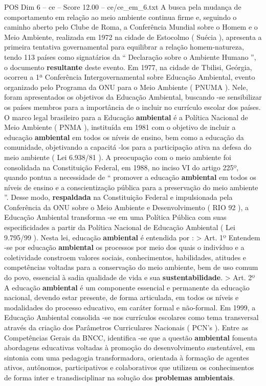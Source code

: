 \begin{textsample}{POS Dim 6 – ce – Score 12.00 – ce/ce\_em\_6.txt}
A busca pela mudança de comportamento em relação ao meio ambiente continua firme e, seguindo o caminho aberto pelo Clube de Roma, a Conferência Mundial sobre o Homem e o Meio Ambiente, realizada em 1972 na cidade de Estocolmo ( Suécia ), apresenta a primeira tentativa governamental para equilibrar a relação homem-natureza, tendo 113 países como signatários da “ Declaração sobre o Ambiente Humano ”, o documento \textbf{resultante} deste evento.
Em 1977, na cidade de Tbilisi, Geórgia, ocorreu a 1ª Conferência Intergovernamental sobre Educação Ambiental, evento organizado pelo Programa da ONU para o Meio Ambiente ( PNUMA ).
Nele, foram apresentados os objetivos da Educação Ambiental, buscando -se sensibilizar os países membros para a importância de o incluir no currículo escolar dos países.
O marco legal brasileiro para a Educação \textbf{ambiental} é a Política Nacional de Meio Ambiente ( PNMA ), instituída em 1981 com o objetivo de incluir a educação \textbf{ambiental} em todos os níveis de ensino, bem como a educação da comunidade, objetivando a capacitá -los para a participação ativa na defesa do meio ambiente ( Lei 6.938/81 ).
A preocupação com o meio ambiente foi consolidada na Constituição Federal, em 1988, no inciso VI do artigo 225º, quando pontua a necessidade de “ promover a educação \textbf{ambiental} em todos os níveis de ensino e a conscientização pública para a preservação do meio ambiente ”.
Desse modo, \textbf{respaldada} na Constituição Federal e impulsionada pela Conferência da ONU sobre o Meio Ambiente e Desenvolvimento ( RIO 92 ), a Educação Ambiental transforma -se em uma Política Pública com suas especificidades a partir da Política Nacional de Educação Ambiental ( Lei 9.795/99 ).
Nesta lei, educação \textbf{ambiental} é entendida por : > Art. 1º Entendem -se por educação \textbf{ambiental} os processos por meio dos quais o indivíduo e a coletividade constroem valores sociais, conhecimentos, habilidades, atitudes e competências voltadas para a conservação do meio ambiente, bem de uso comum do povo, essencial à sadia qualidade de vida e sua \textbf{sustentabilidade}. > Art. 2º A educação \textbf{ambiental} é um componente essencial e permanente da educação nacional, devendo estar presente, de forma articulada, em todos os níveis e modalidades do processo educativo, em caráter formal e não-formal.
Em 1999, a Educação Ambiental consolida -se nos currículos escolares como tema transversal através da criação dos Parâmetros Curriculares Nacionais ( PCN’s ).
Entre as Competências Gerais da BNCC, identifica -se que a questão \textbf{ambiental} fomenta abordagens educativas voltadas à promoção do desenvolvimento sustentável, em sintonia com uma pedagogia transformadora, orientada à formação de agentes ativos, autônomos, participativos e colaborativos que utilizem os conhecimentos de forma inter e transdisciplinar na solução dos \textbf{problemas} \textbf{ambientais}.

\end{textsample}
